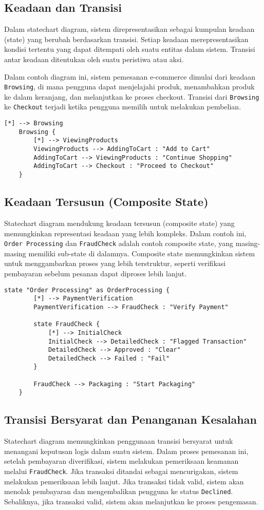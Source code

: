 \subsection{Keadaan dan Transisi}
Dalam statechart diagram, sistem direpresentasikan sebagai kumpulan keadaan (state) yang berubah berdasarkan transisi. Setiap keadaan merepresentasikan kondisi tertentu yang dapat ditempati oleh suatu entitas dalam sistem. Transisi antar keadaan ditentukan oleh suatu peristiwa atau aksi. 

Dalam contoh diagram ini, sistem pemesanan e-commerce dimulai dari keadaan \texttt{Browsing}, di mana pengguna dapat menjelajahi produk, menambahkan produk ke dalam keranjang, dan melanjutkan ke proses checkout. Transisi dari \texttt{Browsing} ke \texttt{Checkout} terjadi ketika pengguna memilih untuk melakukan pembelian.

\begin{lstlisting}[language=puml]
	[*] --> Browsing
	Browsing {
		[*] --> ViewingProducts
		ViewingProducts --> AddingToCart : "Add to Cart"
		AddingToCart --> ViewingProducts : "Continue Shopping"
		AddingToCart --> Checkout : "Proceed to Checkout"
	}
\end{lstlisting}

\subsection{Keadaan Tersusun (Composite State)}
Statechart diagram mendukung keadaan tersusun (composite state) yang memungkinkan representasi keadaan yang lebih kompleks. Dalam contoh ini, \texttt{Order Processing} dan \texttt{FraudCheck} adalah contoh composite state, yang masing-masing memiliki sub-state di dalamnya. Composite state memungkinkan sistem untuk menggambarkan proses yang lebih terstruktur, seperti verifikasi pembayaran sebelum pesanan dapat diproses lebih lanjut.

\begin{lstlisting}[language=puml]
	state "Order Processing" as OrderProcessing {
		[*] --> PaymentVerification
		PaymentVerification --> FraudCheck : "Verify Payment"
		
		state FraudCheck {
			[*] --> InitialCheck
			InitialCheck --> DetailedCheck : "Flagged Transaction"
			DetailedCheck --> Approved : "Clear"
			DetailedCheck --> Failed : "Fail"
		}
		
		FraudCheck --> Packaging : "Start Packaging"
	}
\end{lstlisting}

\subsection{Transisi Bersyarat dan Penanganan Kesalahan}
Statechart diagram memungkinkan penggunaan transisi bersyarat untuk menangani keputusan logis dalam suatu sistem. Dalam proses pemesanan ini, setelah pembayaran diverifikasi, sistem melakukan pemeriksaan keamanan melalui \texttt{FraudCheck}. Jika transaksi ditandai sebagai mencurigakan, sistem melakukan pemeriksaan lebih lanjut. Jika transaksi tidak valid, sistem akan menolak pembayaran dan mengembalikan pengguna ke status \texttt{Declined}. Sebaliknya, jika transaksi valid, sistem akan melanjutkan ke proses pengemasan.

